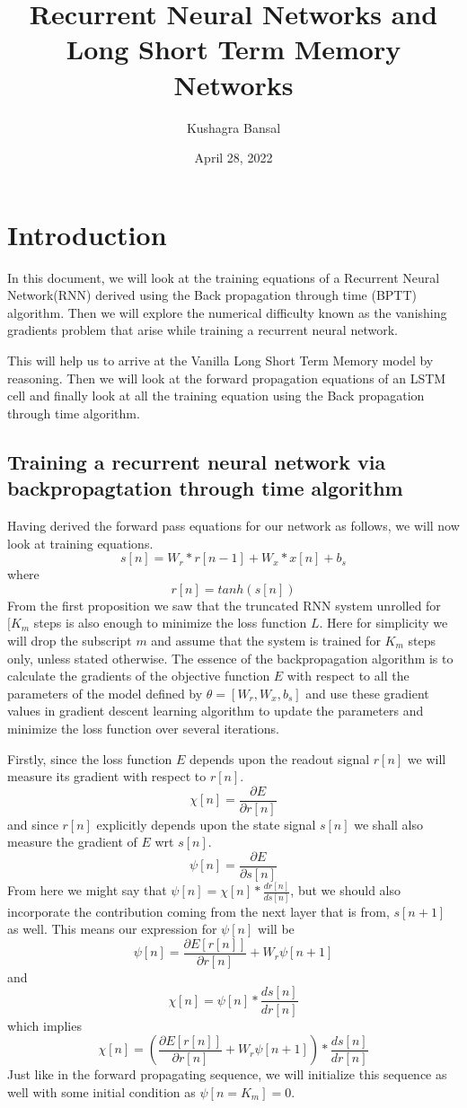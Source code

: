 \documentclass[12pt,a4paper]{article}
\title{Recurrent Neural Networks and Long Short Term Memory Networks}
\author{Kushagra Bansal}
\date{April 28, 2022}
\begin{document}
\maketitle
\tableofcontents
\newpage
{
\section{Introduction}
In this document, we will look at the training equations of a Recurrent Neural Network(RNN) derived using the Back propagation through time (BPTT) algorithm. Then we will explore the numerical difficulty known as the vanishing gradients problem that arise while training a recurrent neural network. 

This will help us to arrive at the Vanilla Long Short Term Memory model by reasoning. Then we will look at the forward propagation equations of an LSTM cell and finally look at all the training equation using the Back propagation through time algorithm.
\subsection{Training a recurrent neural network via backpropagtation through time algorithm}
Having derived the forward pass equations for our network as follows, we will now look at training equations.
\[
s[n] = W_{r}*r[n-1]+W_{x}*x[n]+b_{s}    \tag{1}
\]
where
\[
r[n] = tanh(s[n])                              \tag{2}  
\]
From the first proposition we saw that the truncated RNN system unrolled for $[K_{m}$ steps is also enough to minimize the loss function $L$.
Here for simplicity we will drop the subscript $m$ and assume that the system is trained for $K_{m}$ steps only, unless stated otherwise.
The essence of the backpropagation algorithm is to calculate the gradients of the objective function $E$ with respect to all the parameters of the model defined by $\theta = [W_{r}, W_{x},b_{s}]$ and use these gradient values in gradient descent learning algorithm to update the parameters and minimize the loss function over several iterations.

Firstly, since the loss function $E$ depends upon the readout signal $r[n]$ we will measure its gradient with respect to $r[n]$.
\[
\chi[n] = \frac{\partial{E}}{\partial{r[n]}}  \tag{3}
\]
and since $r[n]$ explicitly depends upon the state signal $s[n]$ we shall also measure the gradient of $E$ wrt $s[n]$.
\[
\psi[n] = \frac{\partial{E}}{\partial{s[n]}}    \tag{4}
\]
From here we might say that $\psi[n] = \chi[n]*\frac{d r[n]}{d s[n]}$, but we should also incorporate the contribution coming from the next layer that is from, $s[n+1]$ as well.
This means our expression for $\psi[n]$ will be
\[
\psi[n] = \frac{\partial{E[r[n]]}}{\partial{r[n]}}+ W_{r}\psi[n+1]   \tag{5}
\]
and
\[
\chi[n] = \psi[n]*\frac{ds[n]}{dr[n]} \tag{6}
\]
which implies 
\[
\chi[n] = \left(\frac{\partial{E[r[n]]}}{\partial{r[n]}}+ W_{r}\psi[n+1]\right)*\frac{ds[n]}{dr[n]}\tag{7}
\]
Just like in the forward propagating sequence, we will initialize this sequence as well with some initial condition as $\psi[n=K_{m}] = 0$.

}
\end{document}
